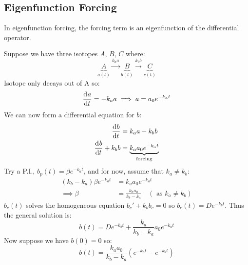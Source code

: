 \documentclass[../main.tex]{subfiles}
\begin{document}
\subsection{Eigenfunction Forcing}
In eigenfunction forcing, the forcing term is an eigenfunction of the differential operator.
\begin{example} \label{radioactive}
  Suppose we have three isotopes $A$, $B$, $C$ where:
  \[
    \underbrace{A}_{a(t)} \xrightarrow{k_a a} \underbrace{B}_{b(t)} \xrightarrow{k_b b} \underbrace{C}_{c(t)}
  \]
  Isotope only decays out of A so:
  \[
    \deriv{a}{t} = -k_a a \implies a = a_0 e^{-k_a t}
  \]
  We can now form a differential equation for $b$:
  \begin{align*}
    \deriv{b}{t} &= k_a a -k_b b \\
    \deriv{b}{t} + k_b b &= \underbrace{k_a a_0 e^{-k_a t}}_{\text{forcing}} \\
  \end{align*}
  Try a P.I., $b_p(t) = \beta e^{-k_a t}$, and for now, assume that $k_a \neq k_b$:
  \begin{align*}
    (k_b - k_a)\beta e^{-k_a t} &= k_a a_0e^{-k_a t} \\
    \implies \beta &= \frac{k_a a_0}{k_b - k_a}\quad(\text{ as } k_a \neq k_b)
  \end{align*}
  $b_c(t)$ solves the homogeneous equation $b_c' + k_b b_c = 0$ so $b_c(t) = De^{-k_b t}$.
  Thus the general solution is:
  \[
    b(t) = De^{-k_b t} + \frac{k_a}{k_b - k_a}a_0 e^{-k_a t}
  \]
  Now suppose we have $b(0) = 0$ so:
  \[
    b(t) = \frac{k_a a_0}{k_b - k_a}(e^{-k_a t} - e^{-k_b t})
  \]
  \begin{center}
\end{center}
\end{example}
\end{document}
